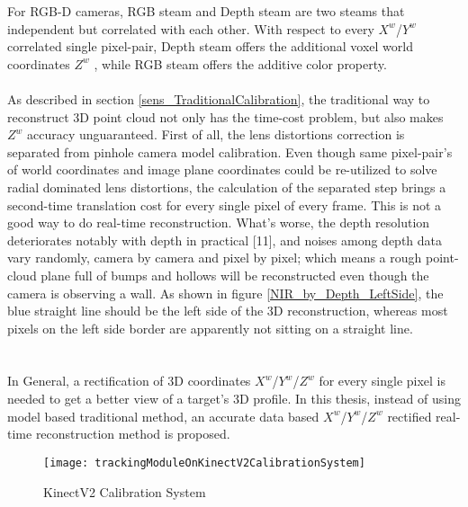 For RGB-D cameras, RGB steam and Depth steam are two steams that independent but correlated with each other. With respect to every \(X^{w}\)/\(Y^{w}\)  correlated single pixel-pair, Depth steam offers the additional voxel world coordinates \(Z^{w}\) , while RGB steam offers the additive color property.
\\
\\As described in section \ref{sens_TraditionalCalibration}, the traditional way to reconstruct 3D point cloud not only has the time-cost problem, but also makes \(Z^{w}\) accuracy unguaranteed. First of all, the lens distortions correction is separated from pinhole camera model calibration. Even though same pixel-pair's of world coordinates and image plane coordinates could be re-utilized to solve radial dominated lens distortions, the calculation of the separated step brings a second-time translation cost for every single pixel of every frame. This is not a good way to do real-time reconstruction. What's worse, the depth resolution deteriorates notably with depth in practical [11],
 and noises among depth data vary randomly, camera by camera and pixel by pixel; which means a rough point-cloud plane full of bumps and hollows will be reconstructed even though the camera is observing a wall. As shown in figure \ref{NIR_by_Depth_LeftSide}, the blue straight line should be the left side of the 3D reconstruction, whereas most pixels on the left side border are apparently not sitting on a straight line.%
\\\\
\\In General, a rectification of 3D coordinates \(X^{w}\)/\(Y^{w}\)/\(Z^{w}\)  for every single pixel is needed to get a better view of a target's 3D profile. In this thesis, instead of using model based traditional method, an accurate data based  \(X^{w}\)/\(Y^{w}\)/\(Z^{w}\) rectified real-time reconstruction method is proposed.\\

\begin{figure}[h]
\centering
\texttt{[image: trackingModuleOnKinectV2CalibrationSystem]}
\caption{KinectV2 Calibration System}
\label{trackingModuleOnKinectV2CalibrationSystem}
\end{figure}%

